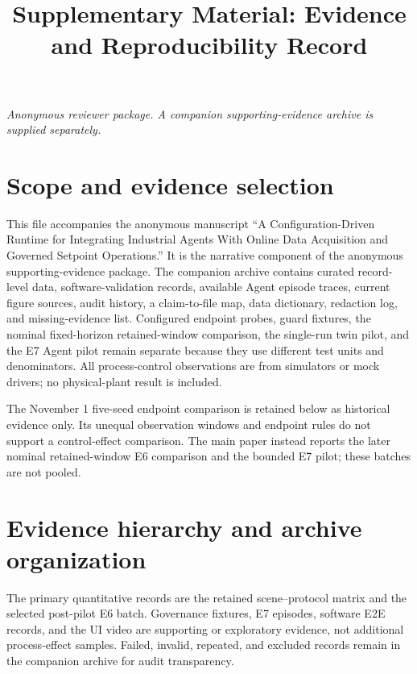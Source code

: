 \documentclass[10pt]{article}
\title{Supplementary Material: Evidence and Reproducibility Record}
\author{}
\date{}
\begin{document}
\maketitle
\noindent\textit{Anonymous reviewer package. A companion supporting-evidence archive is supplied separately.}\par\medskip

\section*{Scope and evidence selection}
This file accompanies the anonymous manuscript ``A Configuration-Driven Runtime for Integrating Industrial Agents With Online Data Acquisition and Governed Setpoint Operations.'' It is the narrative component of the anonymous supporting-evidence package. The companion archive contains curated record-level data, software-validation records, available Agent episode traces, current figure sources, audit history, a claim-to-file map, data dictionary, redaction log, and missing-evidence list. Configured endpoint probes, guard fixtures, the nominal fixed-horizon retained-window comparison, the single-run twin pilot, and the E7 Agent pilot remain separate because they use different test units and denominators. All process-control observations are from simulators or mock drivers; no physical-plant result is included.

The November 1 five-seed endpoint comparison is retained below as historical evidence only. Its unequal observation windows and endpoint rules do not support a control-effect comparison. The main paper instead reports the later nominal retained-window E6 comparison and the bounded E7 pilot; these batches are not pooled.

\section*{Evidence hierarchy and archive organization}
The primary quantitative records are the retained scene--protocol matrix and the selected post-pilot E6 batch. Governance fixtures, E7 episodes, software E2E records, and the UI video are supporting or exploratory evidence, not additional process-effect samples. Failed, invalid, repeated, and excluded records remain in the companion archive for audit transparency.
\end{document}
